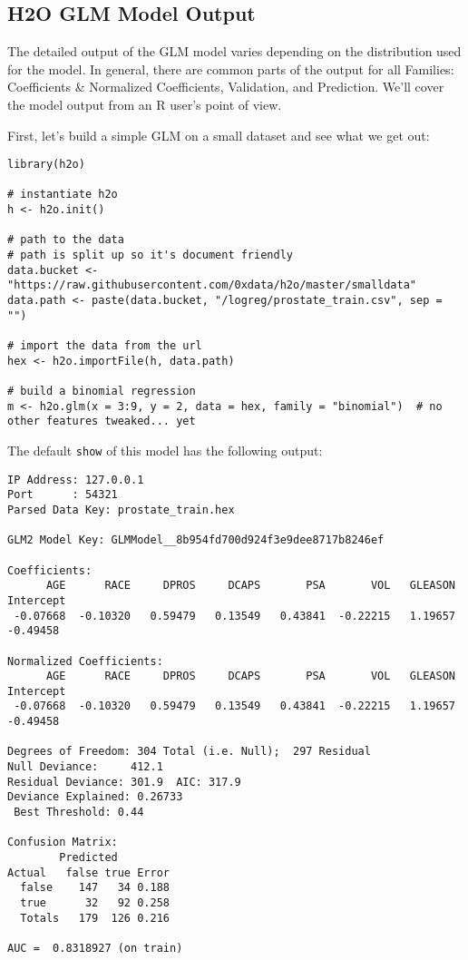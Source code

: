 \documentclass[11pt]{article}
\begin{document}
\subsection{H2O GLM Model Output}
The detailed output of the GLM model varies depending on the distribution used for the model. In general, there are common parts of the output for all Families: Coefficients \& Normalized Coefficients, Validation, and Prediction. We'll cover the model output from an R user's  point of view.

First, let's build a simple GLM on a small dataset and see what we get out:

\begin{verbatim}
library(h2o)

# instantiate h2o
h <- h2o.init()

# path to the data
# path is split up so it's document friendly
data.bucket <- "https://raw.githubusercontent.com/0xdata/h2o/master/smalldata"
data.path <- paste(data.bucket, "/logreg/prostate_train.csv", sep = "")

# import the data from the url
hex <- h2o.importFile(h, data.path)

# build a binomial regression
m <- h2o.glm(x = 3:9, y = 2, data = hex, family = "binomial")  # no other features tweaked... yet
\end{verbatim}

The default \texttt{show} of this model has the following output:

\begin{verbatim}
IP Address: 127.0.0.1 
Port      : 54321 
Parsed Data Key: prostate_train.hex 

GLM2 Model Key: GLMModel__8b954fd700d924f3e9dee8717b8246ef

Coefficients:
      AGE      RACE     DPROS     DCAPS       PSA       VOL   GLEASON Intercept 
 -0.07668  -0.10320   0.59479   0.13549   0.43841  -0.22215   1.19657  -0.49458 

Normalized Coefficients:
      AGE      RACE     DPROS     DCAPS       PSA       VOL   GLEASON Intercept 
 -0.07668  -0.10320   0.59479   0.13549   0.43841  -0.22215   1.19657  -0.49458 

Degrees of Freedom: 304 Total (i.e. Null);  297 Residual
Null Deviance:     412.1
Residual Deviance: 301.9  AIC: 317.9
Deviance Explained: 0.26733 
 Best Threshold: 0.44

Confusion Matrix:
        Predicted
Actual   false true Error
  false    147   34 0.188
  true      32   92 0.258
  Totals   179  126 0.216

AUC =  0.8318927 (on train) 
\end{verbatim}
\end{document}
